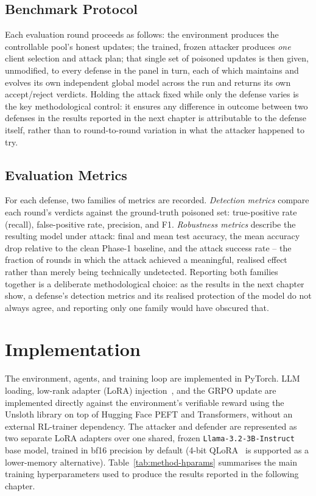\subsection{Benchmark Protocol}
Each evaluation round proceeds as follows: the environment produces the controllable pool's honest updates; the trained, frozen attacker produces \emph{one} client selection and attack plan; that single set of poisoned updates is then given, unmodified, to every defense in the panel in turn, each of which maintains and evolves its own independent global model across the run and returns its own accept/reject verdicts. Holding the attack fixed while only the defense varies is the key methodological control: it ensures any difference in outcome between two defenses in the results reported in the next chapter is attributable to the defense itself, rather than to round-to-round variation in what the attacker happened to try.

\subsection{Evaluation Metrics}
For each defense, two families of metrics are recorded. \emph{Detection metrics} compare each round's verdicts against the ground-truth poisoned set: true-positive rate (recall), false-positive rate, precision, and F1. \emph{Robustness metrics} describe the resulting model under attack: final and mean test accuracy, the mean accuracy drop relative to the clean Phase-1 baseline, and the attack success rate -- the fraction of rounds in which the attack achieved a meaningful, realised effect rather than merely being technically undetected. Reporting both families together is a deliberate methodological choice: as the results in the next chapter show, a defense's detection metrics and its realised protection of the model do not always agree, and reporting only one family would have obscured that.

\section{Implementation}
\label{sec:method-impl}

The environment, agents, and training loop are implemented in PyTorch. LLM loading, low-rank adapter (LoRA) injection~\citep{lora2022}, and the GRPO update are implemented directly against the environment's verifiable reward using the Unsloth library on top of Hugging Face PEFT and Transformers, without an external RL-trainer dependency. The attacker and defender are represented as two separate LoRA adapters over one shared, frozen \texttt{Llama-3.2-3B-Instruct} base model, trained in bf16 precision by default (4-bit QLoRA~\citep{qlora2023} is supported as a lower-memory alternative). Table~\ref{tab:method-hparams} summarises the main training hyperparameters used to produce the results reported in the following chapter.

